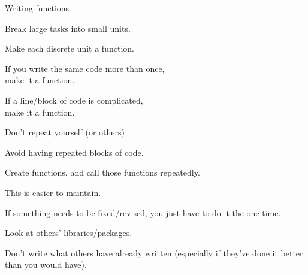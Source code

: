 \documentclass[12pt,t]{beamer}
\begin{document}
\begin{frame}{Writing functions}

\bbi
\item Break large tasks into small units.
  \bi
  \item Make each discrete unit a function.
  \ei
\item If you write the same code more than once, \\
{\hilit make it a function}.
\item If a line/block of code is complicated, \\
{\hilit make it a function}.
\ei

\end{frame}


\begin{frame}{Don't repeat yourself (or others)}

\bbi
\item Avoid having repeated blocks of code.
\item Create functions, and call those functions repeatedly.
\item This is easier to maintain.
  \bi
  \item If something needs to be fixed/revised, you just have to do it
    the one time.
  \ei
\item Look at others' libraries/packages.
  \bi
  \item Don't write what others have already written (especially if
    they've done it better than you would have).
  \ei
\ei

\end{frame}
\end{document}
